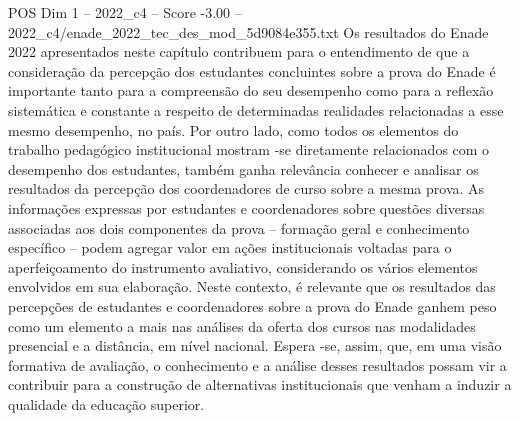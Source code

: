 \begin{textsample}{POS Dim 1 – 2022\_c4 – Score -3.00 – 2022\_c4/enade\_2022\_tec\_des\_mod\_5d9084e355.txt}
Os resultados do Enade 2022 apresentados neste capítulo contribuem para o entendimento de que a consideração da percepção dos estudantes concluintes sobre a prova do Enade é importante tanto para a compreensão do seu desempenho como para a reflexão sistemática e constante a respeito de determinadas realidades relacionadas a esse mesmo desempenho, no país.
Por outro lado, como todos os elementos do trabalho pedagógico institucional mostram -se diretamente relacionados com o desempenho dos estudantes, também ganha relevância conhecer e analisar os resultados da percepção dos coordenadores de curso sobre a mesma prova.
As informações expressas por estudantes e coordenadores sobre questões diversas associadas aos dois componentes da prova – formação geral e conhecimento específico – podem agregar valor em ações institucionais voltadas para o aperfeiçoamento do instrumento avaliativo, considerando os vários elementos envolvidos em sua elaboração.
Neste contexto, é relevante que os resultados das percepções de estudantes e coordenadores sobre a prova do Enade ganhem peso como um elemento a mais nas análises da oferta dos cursos nas modalidades presencial e a distância, em nível nacional.
Espera -se, assim, que, em uma visão formativa de avaliação, o conhecimento e a análise desses resultados possam vir a contribuir para a construção de alternativas institucionais que venham a induzir a qualidade da educação superior.

\end{textsample}
